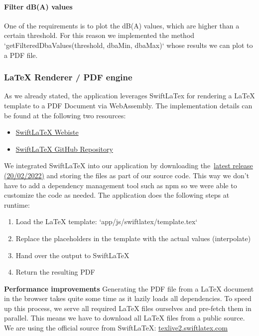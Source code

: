 \paragraph{Filter dB(A) values}
One of the requirements is to plot the dB(A) values, which are higher than a certain threshold.
For this reason we implemented the method `getFilteredDbaValues(threshold, dbaMin, dbaMax)` whose results we can plot to a PDF file.

\subsubsection{LaTeX Renderer / PDF engine}\label{subsubsec:latex-renderer-pdf-engine}
As we already stated, the application leverages SwiftLaTex for rendering a LaTeX template to a PDF Document via WebAssembly.
The implementation details can be found at the following two resources:

\begin{itemize}
    \item \href{https://www.swiftlatex.com/}{SwiftLaTeX Webiste}
    \item \href{https://github.com/SwiftLaTeX/SwiftLaTeX/}{SwiftLaTeX GitHub Repository}
\end{itemize}

We integrated SwiftLaTeX into our application by downloading the~\href{https://github.com/SwiftLaTeX/SwiftLaTeX/releases/tag/v20022022}{latest release (20/02/2022)}
and storing the files as part of our source code.
This way we don't have to add a dependency management tool such as npm so we were able to customize the code as needed.
The application does the following steps at runtime:
\begin{enumerate}
    \item Load the LaTeX template: `app/js/swiftlatex/template.tex`
    \item Replace the placeholders in the template with the actual values (interpolate)
    \item Hand over the output to SwiftLaTeX
    \item Return the resulting PDF
\end{enumerate}

\textbf{Performance improvements}
Generating the PDF file from a LaTeX document in the browser takes quite some time as it lazily loads all dependencies.
To speed up this process, we serve all required LaTeX files ourselves and pre-fetch them in parallel.
This means we have to download all LaTeX files from a public source. We are using the official source from SwiftLaTeX:
\href{https://texlive2.swiftlatex.com/}{texlive2.swiftlatex.com}

